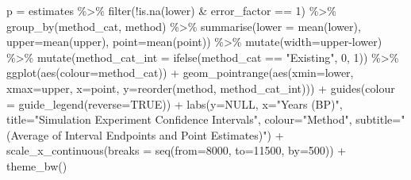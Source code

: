 \documentclass[
]{article}
\newenvironment{Shaded}{\begin{snugshade}}{\end{snugshade}}
\newcommand{\AttributeTok}[1]{\textcolor[rgb]{0.77,0.63,0.00}{#1}}
\newcommand{\ConstantTok}[1]{\textcolor[rgb]{0.00,0.00,0.00}{#1}}
\newcommand{\DecValTok}[1]{\textcolor[rgb]{0.00,0.00,0.81}{#1}}
\newcommand{\FunctionTok}[1]{\textcolor[rgb]{0.00,0.00,0.00}{#1}}
\newcommand{\NormalTok}[1]{#1}
\newcommand{\OtherTok}[1]{\textcolor[rgb]{0.56,0.35,0.01}{#1}}
\newcommand{\SpecialCharTok}[1]{\textcolor[rgb]{0.00,0.00,0.00}{#1}}
\newcommand{\StringTok}[1]{\textcolor[rgb]{0.31,0.60,0.02}{#1}}
\begin{document}
\begin{Shaded}
\begin{Highlighting}[]
\NormalTok{p }\OtherTok{=}\NormalTok{ estimates }\SpecialCharTok{\%\textgreater{}\%}
  \FunctionTok{filter}\NormalTok{(}\SpecialCharTok{!}\FunctionTok{is.na}\NormalTok{(lower) }\SpecialCharTok{\&}\NormalTok{ error\_factor }\SpecialCharTok{==} \DecValTok{1}\NormalTok{) }\SpecialCharTok{\%\textgreater{}\%}
  \FunctionTok{group\_by}\NormalTok{(method\_cat, method) }\SpecialCharTok{\%\textgreater{}\%}
  \FunctionTok{summarise}\NormalTok{(}\AttributeTok{lower =} \FunctionTok{mean}\NormalTok{(lower), }\AttributeTok{upper=}\FunctionTok{mean}\NormalTok{(upper), }\AttributeTok{point=}\FunctionTok{mean}\NormalTok{(point)) }\SpecialCharTok{\%\textgreater{}\%}
  \FunctionTok{mutate}\NormalTok{(}\AttributeTok{width=}\NormalTok{upper}\SpecialCharTok{{-}}\NormalTok{lower) }\SpecialCharTok{\%\textgreater{}\%}
  \FunctionTok{mutate}\NormalTok{(}\AttributeTok{method\_cat\_int =} \FunctionTok{ifelse}\NormalTok{(method\_cat }\SpecialCharTok{==} \StringTok{"Existing"}\NormalTok{, }\DecValTok{0}\NormalTok{, }\DecValTok{1}\NormalTok{)) }\SpecialCharTok{\%\textgreater{}\%}
  \FunctionTok{ggplot}\NormalTok{(}\FunctionTok{aes}\NormalTok{(}\AttributeTok{colour=}\NormalTok{method\_cat)) }\SpecialCharTok{+}
  \FunctionTok{geom\_pointrange}\NormalTok{(}\FunctionTok{aes}\NormalTok{(}\AttributeTok{xmin=}\NormalTok{lower, }\AttributeTok{xmax=}\NormalTok{upper, }\AttributeTok{x=}\NormalTok{point, }\AttributeTok{y=}\FunctionTok{reorder}\NormalTok{(method, method\_cat\_int))) }\SpecialCharTok{+}
  \FunctionTok{guides}\NormalTok{(}\AttributeTok{colour =} \FunctionTok{guide\_legend}\NormalTok{(}\AttributeTok{reverse=}\ConstantTok{TRUE}\NormalTok{)) }\SpecialCharTok{+}
  \FunctionTok{labs}\NormalTok{(}\AttributeTok{y=}\ConstantTok{NULL}\NormalTok{, }\AttributeTok{x=}\StringTok{"Years (BP)"}\NormalTok{,}
       \AttributeTok{title=}\StringTok{"Simulation Experiment Confidence Intervals"}\NormalTok{,}
       \AttributeTok{colour=}\StringTok{"Method"}\NormalTok{,}
       \AttributeTok{subtitle=}\StringTok{"(Average of Interval Endpoints and Point Estimates)"}\NormalTok{) }\SpecialCharTok{+}
  \FunctionTok{scale\_x\_continuous}\NormalTok{(}\AttributeTok{breaks =} \FunctionTok{seq}\NormalTok{(}\AttributeTok{from=}\DecValTok{8000}\NormalTok{, }\AttributeTok{to=}\DecValTok{11500}\NormalTok{, }\AttributeTok{by=}\DecValTok{500}\NormalTok{)) }\SpecialCharTok{+}
  \FunctionTok{theme\_bw}\NormalTok{()}
\end{Highlighting}
\end{Shaded}
\end{document}
